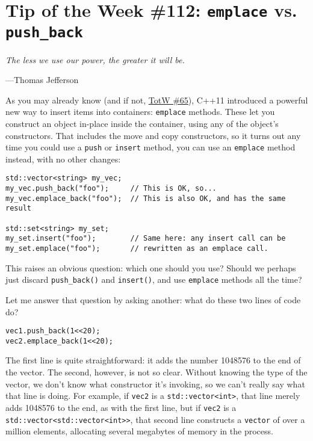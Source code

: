 
\chapter{Tip of the Week \#112: \texorpdfstring{\texttt{emplace} vs. \texttt{push_back}}{}}\label{ch:tip-of-the-week-112}

\epigraph{\itshape The less we use our power, the greater it will be.}{---Thomas Jefferson}

As you may already know (and if not, \hyperref[ch:tip-of-the-week-65]{TotW \#65}), C++11 introduced a powerful new way to insert items into containers: \texttt{emplace} methods. These let you construct an object in-place inside the container, using any of the object’s constructors. That includes the move and copy constructors, so it turns out any time you could use a \texttt{push} or \texttt{insert} method, you can use an \texttt{emplace} method instead, with no other changes:
\begin{verbatim}
std::vector<string> my_vec;
my_vec.push_back("foo");     // This is OK, so...
my_vec.emplace_back("foo");  // This is also OK, and has the same result

std::set<string> my_set;
my_set.insert("foo");        // Same here: any insert call can be
my_set.emplace("foo");       // rewritten as an emplace call.
\end{verbatim}

This raises an obvious question: which one should you use? Should we perhaps just discard \texttt{push_back()} and \texttt{insert()}, and use \texttt{emplace} methods all the time?

Let me answer that question by asking another: what do these two lines of code do?
\begin{verbatim}
vec1.push_back(1<<20);
vec2.emplace_back(1<<20);
\end{verbatim}

The first line is quite straightforward: it adds the number 1048576 to the end of the vector. The second, however, is not so clear. Without knowing the type of the vector, we don’t know what constructor it’s invoking, so we can’t really say what that line is doing. For example, if \texttt{vec2} is a \texttt{std::vector<int>}, that line merely adds 1048576 to the end, as with the first line, but if \texttt{vec2} is a \texttt{std::vector<std::vector<int>>}, that second line constructs a \texttt{vector} of over a million elements, allocating several megabytes of memory in the process.

